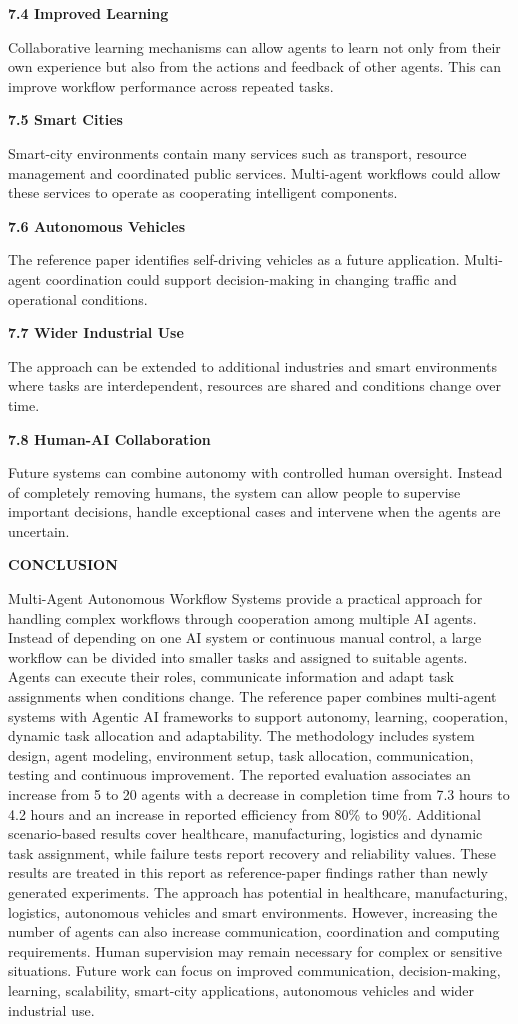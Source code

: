 \documentclass[12pt,letterpaper]{article}
\newcommand{\singlechaptertitle}[1]{%
  \begin{center}
    {\fontsize{15pt}{18pt}\selectfont\bfseries #1\par}%
  \end{center}%
  \vspace{10pt}%
}
\newcommand{\sectiontitle}[1]{%
  \vspace{6pt}%
  {\noindent\fontsize{13.2pt}{16pt}\selectfont\bfseries #1\par}%
  \vspace{2pt}%
}
\newcommand{\bodytextstyle}{\fontsize{11.3pt}{25.8pt}\selectfont}
\begin{document}
\sectiontitle{7.4 Improved Learning}
Collaborative learning mechanisms can allow agents to learn not only from their own experience but also from the actions and feedback of other agents. This can improve workflow performance across repeated tasks.

\sectiontitle{7.5 Smart Cities}
Smart-city environments contain many services such as transport, resource management and coordinated public services. Multi-agent workflows could allow these services to operate as cooperating intelligent components.
\newpage

\bodytextstyle
\sectiontitle{7.6 Autonomous Vehicles}
The reference paper identifies self-driving vehicles as a future application. Multi-agent coordination could support decision-making in changing traffic and operational conditions.

\sectiontitle{7.7 Wider Industrial Use}
The approach can be extended to additional industries and smart environments where tasks are interdependent, resources are shared and conditions change over time.

\sectiontitle{7.8 Human-AI Collaboration}
Future systems can combine autonomy with controlled human oversight. Instead of completely removing humans, the system can allow people to supervise important decisions, handle exceptional cases and intervene when the agents are uncertain.
\newpage

\bodytextstyle
\singlechaptertitle{CONCLUSION}

Multi-Agent Autonomous Workflow Systems provide a practical approach for handling complex workflows through cooperation among multiple AI agents. Instead of depending on one AI system or continuous manual control, a large workflow can be divided into smaller tasks and assigned to suitable agents. Agents can execute their roles, communicate information and adapt task assignments when conditions change. The reference paper combines multi-agent systems with Agentic AI frameworks to support autonomy, learning, cooperation, dynamic task allocation and adaptability. The methodology includes system design, agent modeling, environment setup, task allocation, communication, testing and continuous improvement. The reported evaluation associates an increase from 5 to 20 agents with a decrease in completion time from 7.3 hours to 4.2 hours and an increase in reported efficiency from 80\% to 90\%. Additional scenario-based results cover healthcare, manufacturing, logistics and dynamic task assignment, while failure tests report recovery and reliability values. These results are treated in this report as reference-paper findings rather than newly generated experiments. The approach has potential in healthcare, manufacturing, logistics, autonomous vehicles and smart environments. However, increasing the number of agents can also increase communication, coordination and computing requirements. Human supervision may remain necessary for complex or sensitive situations. Future work can focus on improved communication, decision-making, learning, scalability, smart-city applications, autonomous vehicles and wider industrial use.
\newpage
\end{document}
